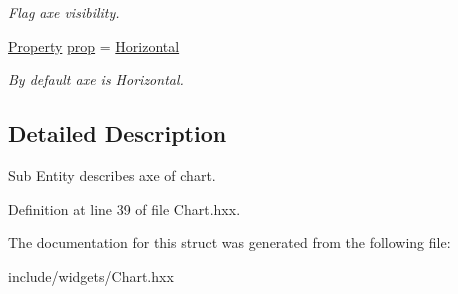 \begin{DoxyCompactItemize}
\begin{DoxyCompactList}\small\item\em Flag axe visibility. \end{DoxyCompactList}\item 
\mbox{\label{structeven_1_1_chart_1_1_axe_a3c543a411c3133ffec7c69bb24f0e459}} 
\mbox{\hyperlink{classeven_1_1_chart_aba4e4fe076d6d3d4682ec5e67ec68b66}{Property}} \mbox{\hyperlink{structeven_1_1_chart_1_1_axe_a3c543a411c3133ffec7c69bb24f0e459}{prop}} = \mbox{\hyperlink{classeven_1_1_chart_aba4e4fe076d6d3d4682ec5e67ec68b66afde75bcee70400375cc836e33ccc23d7}{Horizontal}}
\begin{DoxyCompactList}\small\item\em By default axe is Horizontal. \end{DoxyCompactList}\end{DoxyCompactItemize}


\subsection{Detailed Description}
Sub Entity describes axe of chart. 

Definition at line 39 of file Chart.\+hxx.



The documentation for this struct was generated from the following file\+:\begin{DoxyCompactItemize}
\item 
include/widgets/Chart.\+hxx\end{DoxyCompactItemize}
